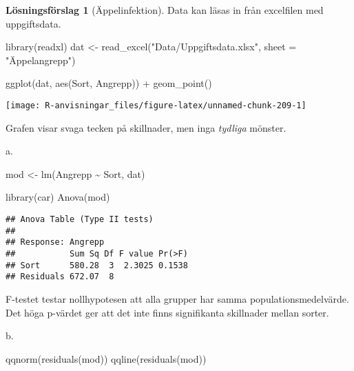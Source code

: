 \documentclass[
]{book}
\newenvironment{Shaded}{\begin{snugshade}}{\end{snugshade}}
\newcommand{\AttributeTok}[1]{\textcolor[rgb]{0.77,0.63,0.00}{#1}}
\newcommand{\FunctionTok}[1]{\textcolor[rgb]{0.00,0.00,0.00}{#1}}
\newcommand{\NormalTok}[1]{#1}
\newcommand{\OtherTok}[1]{\textcolor[rgb]{0.56,0.35,0.01}{#1}}
\newcommand{\SpecialCharTok}[1]{\textcolor[rgb]{0.00,0.00,0.00}{#1}}
\newcommand{\StringTok}[1]{\textcolor[rgb]{0.31,0.60,0.02}{#1}}
\theoremstyle{definition}
\theoremstyle{definition}
\theoremstyle{definition}
\theoremstyle{definition}
\newtheorem{hypothesis}{Lösningsförslag}[chapter]
\theoremstyle{remark}
\begin{document}
\begin{hypothesis}[Äppelinfektion]
Data kan läsas in från excelfilen med uppgiftsdata.

\begin{Shaded}
\begin{Highlighting}[]
\FunctionTok{library}\NormalTok{(readxl)}
\NormalTok{dat }\OtherTok{\textless{}{-}} \FunctionTok{read\_excel}\NormalTok{(}\StringTok{"Data/Uppgiftsdata.xlsx"}\NormalTok{, }\AttributeTok{sheet =} \StringTok{"Äppelangrepp"}\NormalTok{)}

\FunctionTok{ggplot}\NormalTok{(dat, }\FunctionTok{aes}\NormalTok{(Sort, Angrepp)) }\SpecialCharTok{+}
  \FunctionTok{geom\_point}\NormalTok{()}
\end{Highlighting}
\end{Shaded}

\begin{center}\texttt{[image: R-anvisningar\_files/figure-latex/unnamed-chunk-209-1]} \end{center}

Grafen visar svaga tecken på skillnader, men inga \emph{tydliga} mönster.

a.

\begin{Shaded}
\begin{Highlighting}[]
\NormalTok{mod }\OtherTok{\textless{}{-}} \FunctionTok{lm}\NormalTok{(Angrepp }\SpecialCharTok{\textasciitilde{}}\NormalTok{ Sort, dat)}

\FunctionTok{library}\NormalTok{(car)}
\FunctionTok{Anova}\NormalTok{(mod)}
\end{Highlighting}
\end{Shaded}

\begin{verbatim}
## Anova Table (Type II tests)
## 
## Response: Angrepp
##           Sum Sq Df F value Pr(>F)
## Sort      580.28  3  2.3025 0.1538
## Residuals 672.07  8
\end{verbatim}

F-testet testar nollhypotesen att alla grupper har samma populationsmedelvärde. Det höga p-värdet ger att det inte finns signifikanta skillnader mellan sorter.

b.

\begin{Shaded}
\begin{Highlighting}[]
\FunctionTok{qqnorm}\NormalTok{(}\FunctionTok{residuals}\NormalTok{(mod))}
\FunctionTok{qqline}\NormalTok{(}\FunctionTok{residuals}\NormalTok{(mod))}
\end{Highlighting}
\end{Shaded}


\end{hypothesis}
\end{document}
